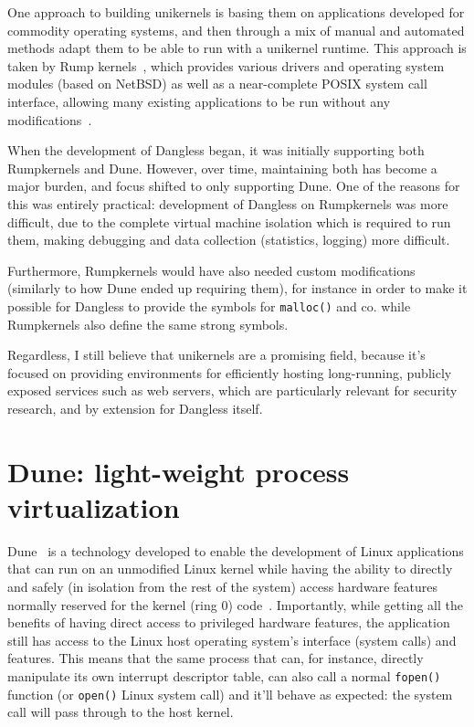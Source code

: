 One approach to building unikernels is basing them on applications developed for commodity operating systems, and then through a mix of manual and automated methods adapt them to be able to run with a unikernel runtime. This approach is taken by Rump kernels~\cite{rumpkernels-web}, which provides various drivers and operating system modules (based on NetBSD) as well as a near-complete POSIX system call interface, allowing many existing applications to be run without any modifications~\cite{rumpkernels-doc}.

When the development of Dangless began, it was initially supporting both Rumpkernels and Dune. However, over time, maintaining both has become a major burden, and focus shifted to only supporting Dune. One of the reasons for this was entirely practical: development of Dangless on Rumpkernels was more difficult, due to the complete virtual machine isolation which is required to run them, making debugging and data collection (statistics, logging) more difficult.

Furthermore, Rumpkernels would have also needed custom modifications (similarly to how Dune ended up requiring them), for instance in order to make it possible for Dangless to provide the symbols for \lstinline!malloc()! and co. while Rumpkernels also define the same strong symbols.

Regardless, I still believe that unikernels are a promising field, because it's focused on providing environments for efficiently hosting long-running, publicly exposed services such as web servers, which are particularly relevant for security research, and by extension for Dangless itself.

\section{Dune: light-weight process virtualization}
\label{sec:bg-dune}

Dune~\cite{dune-website} is a technology developed to enable the development of Linux applications that can run on an unmodified Linux kernel while having the ability to directly and safely (in isolation from the rest of the system) access hardware features normally reserved for the kernel (ring 0) code~\cite{dune-paper}. Importantly, while getting all the benefits of having direct access to privileged hardware features, the application still has access to the Linux host operating system's interface (system calls) and features. This means that the same process that can, for instance, directly manipulate its own interrupt descriptor table, can also call a normal \lstinline!fopen()! function (or \lstinline!open()! Linux system call) and it'll behave as expected: the system call will pass through to the host kernel.

